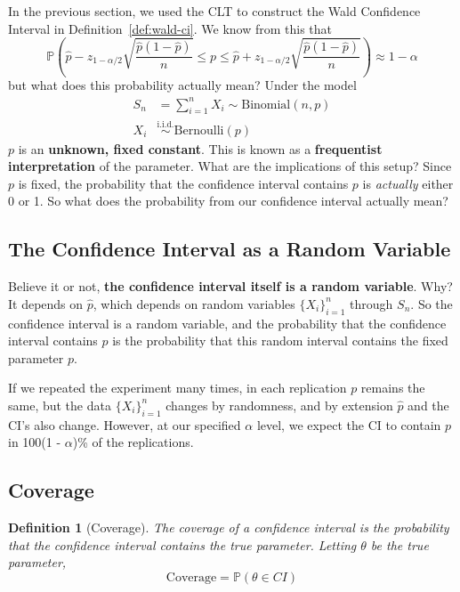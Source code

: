 \documentclass[twoside]{article}
\newtheorem{definition}[theorem]{Definition}
\theoremstyle{definition}
\begin{document}
In the previous section, we used the CLT to construct the Wald Confidence Interval in Definition~\ref{def:wald-ci}. We know from this that
\begin{equation}
   \mathbb{P}\left(\widehat{p} - z_{1-\alpha/2} \sqrt{\frac{\widehat{p}(1-\widehat{p})}{n}} \leq p \leq \widehat{p} + z_{1-\alpha/2} \sqrt{\frac{\widehat{p}(1-\widehat{p})}{n}}\right) \approx 1 - \alpha
\end{equation}
but what does this probability actually mean? Under the model
\begin{align*}
   S_n &= \sum_{i=1}^n X_i \sim \text{Binomial}(n, p) \\
   X_i &\stackrel{\text{i.i.d.}}{\sim} \text{Bernoulli}(p)
\end{align*}
$p$ is an \textbf{unknown, fixed constant}. This is known as a \textbf{frequentist interpretation} of the parameter. What are the implications of this setup? Since $p$ is fixed, the probability that the confidence interval contains $p$ is \textit{actually} either 0 or 1. So what does the probability from our confidence interval actually mean?

\subsection{The Confidence Interval as a Random Variable}
Believe it or not, \textbf{the confidence interval itself is a random variable}. Why? It depends on $\widehat{p}$, which depends on random variables $\{X_i\}_{i=1}^n$ through $S_n$. So the confidence interval is a random variable, and the probability that the confidence interval contains $p$ is the probability that this random interval contains the fixed parameter $p$.

If we repeated the experiment many times, in each replication $p$ remains the same, but the data $\{X_i\}_{i=1}^n$ changes by randomness, and by extension $\widehat{p}$ and the CI's also change. However, at our specified $\alpha$ level, we expect the CI to contain $p$ in 100(1 - $\alpha$)\% of the replications.

\subsection{Coverage}

\begin{definition}[Coverage]
   The coverage of a confidence interval is the probability that the confidence interval contains the true parameter. Letting $\theta$ be the true parameter,
   \begin{equation}
      \text{Coverage} = \mathbb{P}\left(\theta \in CI\right)
   \end{equation}
\end{definition}
\end{document}
